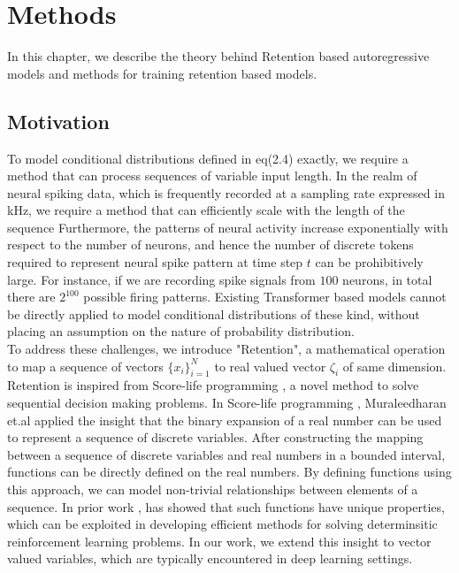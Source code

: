 \chapter{Methods}\label{ch:methods}
In this chapter, we describe the theory behind Retention based autoregressive models and methods for training retention based models. 
\section{Motivation}

To model conditional distributions defined in eq(2.4) exactly, we require a method that can process sequences of variable input length. In the realm of neural spiking data, which is frequently recorded at a sampling rate expressed in kHz, we require a method that can efficiently scale with the length of the sequence Furthermore, the patterns of neural activity increase exponentially with respect to the number of neurons, and hence the number of discrete tokens required to represent neural spike pattern at time step $t$ can be prohibitively large. For instance, if we are recording spike signals from $100$ neurons, in total there are $2^{100}$ possible firing patterns. Existing Transformer based models cannot be directly applied to model conditional distributions of these kind, without placing an assumption on the nature of probability distribution. \\

To address these challenges, we introduce "Retention", a mathematical operation to map a sequence of vectors $\{x_i\}_{i=1}^N$ to real valued vector $\zeta_i$ of same dimension. Retention is inspired from Score-life programming \cite{muraleedharan2023beyond}, a novel method to solve sequential decision making problems. In Score-life programming \cite{muraleedharan2023beyond}, Muraleedharan et.al applied the insight that the binary expansion of a real number can be used to represent a sequence of discrete variables. After constructing the mapping between a sequence of discrete variables and real numbers in a bounded interval, functions can be directly defined on the real numbers. By defining functions using this approach, we can model non-trivial relationships between elements of a sequence. In prior work \cite{muraleedharan2023beyond}, has showed that such functions have unique properties, which can be exploited in developing efficient methods for solving determinsitic reinforcement learning problems. In our work, we extend this insight to vector valued variables, which are typically encountered in deep learning settings. 

